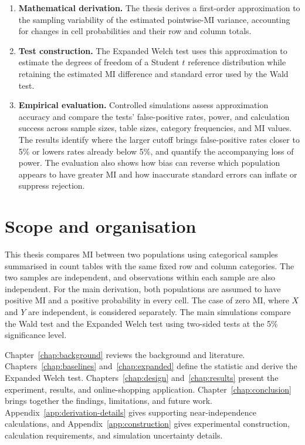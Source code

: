 \begin{enumerate}
  \item \begin{samepage}\textbf{Mathematical derivation.} The thesis derives a first-order
  approximation to the sampling variability of the estimated pointwise-MI
  variance, accounting for changes in cell probabilities and their row and
  column totals.
  \par
  \end{samepage}

  \item \begin{samepage}\textbf{Test construction.} The Expanded Welch test uses this
  approximation to estimate the degrees of freedom of a Student \(t\)
  reference distribution while retaining the estimated MI difference and
  standard error used by the Wald test.
  \par
  \end{samepage}

  \item \begin{samepage}\textbf{Empirical evaluation.} Controlled simulations assess
  approximation accuracy and compare the tests' false-positive rates, power,
  and calculation success across sample sizes, table sizes, category
  frequencies, and MI values. The results identify where the larger cutoff
  brings false-positive rates closer to 5\% or lowers rates already below
  5\%, and quantify the accompanying loss of power. The evaluation also
  shows how bias can reverse which population appears to have greater MI
  and how inaccurate standard errors can inflate or suppress rejection.
  \par
  \end{samepage}
\end{enumerate}

\section{Scope and organisation}

This thesis compares MI between two populations using categorical samples
summarised in count tables with the same fixed row and column categories.
The two samples
are independent, and observations within each sample are also independent.
For the main derivation, both populations are assumed to have positive MI
and a positive probability in every cell. The case of zero MI, where
\(X\) and \(Y\) are independent, is considered separately.
The main simulations compare the Wald test and the Expanded Welch test using
two-sided tests at the 5\% significance level.

Chapter~\ref{chap:background} reviews the background and literature.
Chapters~\ref{chap:baselines} and~\ref{chap:expanded} define the statistic
and derive the Expanded Welch test. Chapters~\ref{chap:design} and~\ref{chap:results}
present the experiment, results, and online-shopping application.
Chapter~\ref{chap:conclusion} brings together the findings, limitations,
and future work. Appendix~\ref{app:derivation-details} gives supporting
near-independence calculations, and Appendix~\ref{app:construction}
gives experimental construction, calculation requirements, and simulation
uncertainty details.
